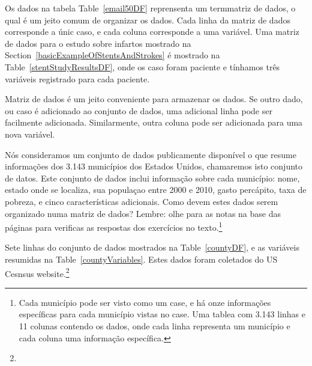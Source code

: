 
Os dados na tabela Table~\ref{email50DF} reprensenta um term{matriz de dados}, o qual é um jeito comum de organizar os dados. Cada linha da matriz de dados corresponde a únic caso, e cada coluna corresponde a uma variável. Uma matriz de dados para o estudo sobre infartos mostrado na Section~\ref{basicExampleOfStentsAndStrokes} é mostrado na Table~\vref{stentStudyResultsDF}, onde os caso foram paciente e tínhamos três variáveis registrado para cada paciente. 

Matriz de dados é um jeito conveniente para armazenar os dados. Se outro dado, ou caso é adicionado ao conjunto de dados, uma adicional linha pode ser facilmente adicionada. Similarmente, outra coluna pode ser adicionada para uma nova variável.


\begin{exercise}
    Nós consideramos um conjunto de dados publicamente disponível o que resume informações dos 3.143 municípios dos Estados Unidos, chamaremos isto  conjunto de datos. Este conjunto de dados inclui informação sobre cada município: nome, estado onde se localiza, sua populaçao entre 2000 e 2010, gasto percápito, taxa de pobreza, e cinco características adicionais. Como devem estes dados serem organizado numa matriz de dados? Lembre: olhe para as notas na base das páginas para verificas as respostas dos exercícios no texto.\footnote{Cada município pode ser visto como um case, e há onze informações específicas para cada município vistas no case. Uma tablea com 3.143 linhas e 11 colunas contendo os dados, onde cada linha representa um município e cada coluna uma informação específica.}
\end{exercise}

\noindent Sete linhas do  conjunto de dados mostrados na Table~\ref{countyDF}, e as variáveis resumidas na Table~\ref{countyVariables}. Estes dados foram coletados do US Cesnsus website.\footnote{}

